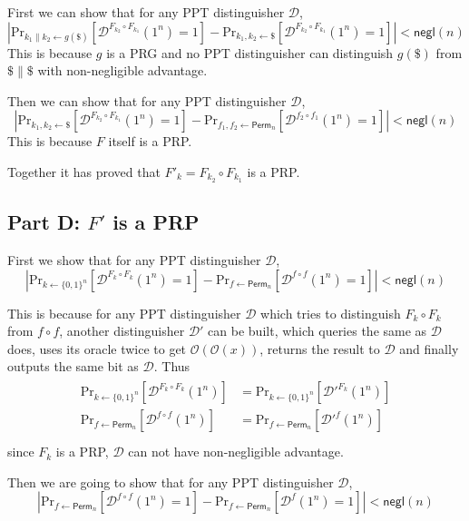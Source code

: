 \documentclass[8pt]{article}
\theoremstyle{compact}
\begin{document}
First we can show that for any PPT distinguisher $\mathcal D$, $$\left| \text{Pr}_{k_1 \| k_2 \gets g(\$)}\left[\mathcal D^{F_{k_2} \circ F_{k_1}}(1^n) = 1\right] - \text{Pr}_{k_1, k_2 \gets \$}\left[\mathcal D^{F_{k_2} \circ F_{k_1}}(1^n) = 1\right] \right| < \textsf{negl}(n)$$
This is because $g$ is a PRG and no PPT distinguisher can distinguish $g(\$)$ from $\$ \| \$$ with non-negligible advantage.

Then we can show that for any PPT distinguisher $\mathcal D$, $$\left| \text{Pr}_{k_1, k_2 \gets \$}\left[\mathcal D^{F_{k_2} \circ F_{k_1}}(1^n) = 1\right] - \text{Pr}_{f_1, f_2 \gets \textsf{Perm}_n}\left[\mathcal D^{f_2 \circ f_1}(1^n) = 1\right] \right| < \textsf{negl}(n)$$
This is because $F$ itself is a PRP.

Together it has proved that $F'_k = F_{k_2} \circ F_{k_1}$ is a PRP.

\subsection*{Part D: $F'$ is a PRP}

First we show that for any PPT distinguisher $\mathcal D$, $$\left| \text{Pr}_{k \gets \{0, 1\}^n}\left[\mathcal D^{F_k \circ F_k}(1^n) = 1\right] - \text{Pr}_{f \gets \textsf{Perm}_n}\left[\mathcal D^{f \circ f}(1^n) = 1\right] \right| < \textsf{negl}(n)$$

This is because for any PPT distinguisher $\mathcal D$ which tries to distinguish $F_k \circ F_k$ from $f \circ f$, another distinguisher $\mathcal D'$ can be built, which queries the same as $\mathcal D$ does, uses its oracle twice to get $\mathcal O(\mathcal O(x))$, returns the result to $\mathcal D$ and finally outputs the same bit as $\mathcal D$. Thus \begin{align*}
	\begin{split}
		\text{Pr}_{k \gets \{0, 1\}^n}\left[\mathcal D^{F_k \circ F_k}(1^n)\right] &= \text{Pr}_{k \gets \{0, 1\}^n}\left[\mathcal D'^{F_k}(1^n)\right] \\
		\text{Pr}_{f \gets \textsf{Perm}_n}\left[\mathcal D^{f \circ f}(1^n)\right] &= \text{Pr}_{f \gets \textsf{Perm}_n}\left[\mathcal D'^{f}(1^n)\right] \\
	\end{split}
\end{align*}
since $F_k$ is a PRP, $\mathcal D$ can not have non-negligible advantage.

Then we are going to show that for any PPT distinguisher $\mathcal D$, $$\left|\text{Pr}_{f \gets \textsf{Perm}_n}\left[\mathcal D^{f \circ f}(1^n) = 1\right] - \text{Pr}_{f \gets \textsf{Perm}_n}\left[\mathcal D^{f}(1^n) = 1\right]\right| < \textsf{negl}(n)$$
\end{document}

